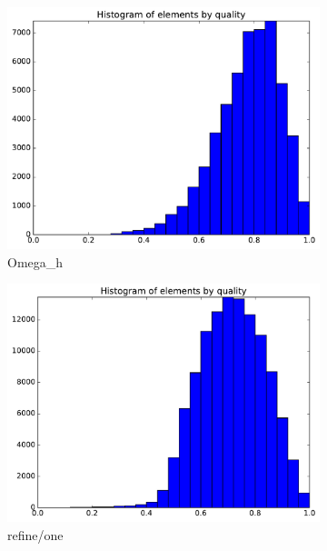 \documentclass[3p,times,procedia,number]{elsarticle}
\begin{document}
\begin{figure}
\begin{subfigure}{.4\textwidth}
\includegraphics[width=\textwidth]{omega_h-cube-linear-quality.pdf}
\caption{Omega\_h}
\end{subfigure}
\begin{subfigure}{.4\textwidth}
\centering
\includegraphics[width=\textwidth]{refine-one-cube-linear-quality.pdf}
\caption{refine/one}
\end{subfigure}
\begin{subfigure}{.4\textwidth}
\centering

\end{subfigure}
\end{figure}
\end{document}
